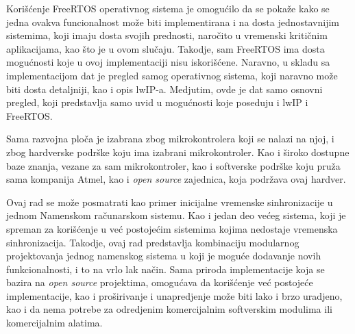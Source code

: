 \documentclass[a4paper,12pt, master]{etf}
\begin{document}
	Kori\v{s}\'{c}enje FreeRTOS operativnog sistema je omogu\'{c}ilo da se 
	poka\v{z}e kako se jedna ovakva funcionalnost mo\v{z}e biti implementirana 
	i na dosta jednostavnijim sistemima, koji imaju dosta svojih prednosti, 
	naro\v{c}ito u vremenski kriti\v{c}nim aplikacijama, kao \v{s}to je u ovom 
	slu\v{c}aju. Takodje, sam FreeRTOS ima dosta mogu\'{c}nosti koje u ovoj 
	implementaciji nisu iskori\v{s}\'{c}ene. Naravno, u skladu sa 
	implementacijom dat je pregled samog operativnog sistema, koji naravno 
	mo\v{z}e biti dosta detaljniji, kao i opis lwIP-a. Medjutim, ovde je dat 
	samo osnovni pregled, koji predstavlja samo uvid u mogu\'{c}nosti koje 
	poseduju i lwIP i FreeRTOS.

	Sama razvojna plo\v{c}a je izabrana zbog mikrokontrolera koji se nalazi na 
	njoj, i zbog hardverske podr\v{s}ke koju ima izabrani mikrokontroler. Kao i 
	\v{s}iroko dostupne baze znanja, vezane za sam mikrokontroler, kao i 
	softverske podr\v{s}ke koju pru\v{z}a sama kompanija Atmel, kao i 
	\textit{open source} zajednica, koja podr\v{z}ava ovaj hardver.

	Ovaj rad se mo\v{z}e posmatrati kao primer inicijalne vremenske 
	sinhronizacije u jednom Namenskom ra\v{c}unarskom sistemu. Kao i jedan deo 
	ve\'{c}eg sistema, koji je spreman za kori\v{s}\'{c}enje u ve\'{c} 
	postoje\'{c}im sistemima kojima nedostaje vremenska sinhronizacija. Takodje,
	 ovaj rad predstavlja kombinaciju modularnog projektovanja jednog namenskog 
	sistema u koji je mogu\'{c}e dodavanje novih funkcionalnosti, i to na vrlo 
	lak na\v{c}in. Sama priroda implementacije koja se bazira na 
	\textit{open source} projektima, omogu\'{c}ava da kori\v{s}\'{c}enje 
	ve\'{c} postoje\'{c}e implementacije, kao i pro\v{s}irivanje i unapredjenje 
	mo\v{z}e biti lako i brzo uradjeno, kao i da nema potrebe za odredjenim 
	komercijalnim softverskim modulima ili komercijalnim alatima. 
\end{document}
